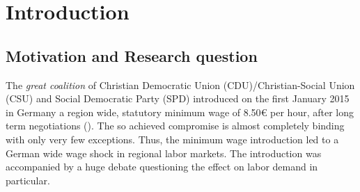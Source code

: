 \documentclass[a4paper]{article}
\begin{document}
\pagebreak
\section{Introduction}
\subsection{Motivation and Research question}
The \textit{great coalition} of Christian Democratic Union (CDU)/Christian-Social Union (CSU) and Social Democratic Party (SPD) introduced on the first January 2015 in Germany a region wide, statutory minimum wage of 8.50{\euro} per hour, after long term negotiations (\cite{bundestag}). The so achieved compromise is almost completely binding with only very few exceptions. Thus, the minimum wage introduction led to a German wide wage shock in regional labor markets. The introduction was accompanied by a huge debate questioning the effect on labor demand in particular.
\end{document}
